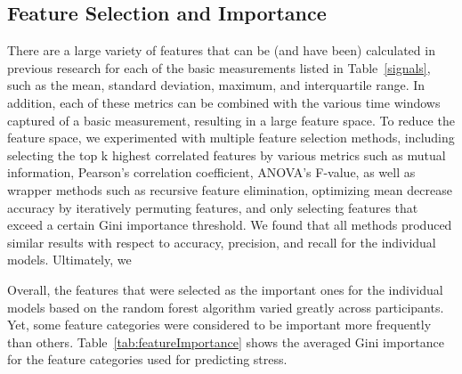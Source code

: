 \subsection{Feature Selection and Importance}
There are a large variety of features that can be (and have been) calculated in previous research for each of the basic measurements listed in Table~\ref{signals}, such as the mean, standard deviation, maximum, and interquartile range. In addition, each of these metrics can be combined with the various time windows captured of a basic measurement, resulting in a large feature space. To reduce the feature space, we experimented with multiple feature selection methods, including selecting the top k highest correlated features by various metrics such as mutual information, Pearson's correlation coefficient, ANOVA's F-value, as well as wrapper methods such as recursive feature elimination, optimizing mean decrease accuracy by iteratively permuting features, and only selecting features that exceed a certain Gini importance threshold. We found that all methods produced similar results with respect to accuracy, precision, and recall for the individual models. Ultimately, we 

Overall, the features that were selected as the important ones for the individual models based on the random forest algorithm varied greatly across participants. Yet, some feature categories were considered to be important more frequently than others. Table~\ref{tab:featureImportance} shows the averaged Gini importance for the feature categories used for predicting stress. \\[-0.1cm]


